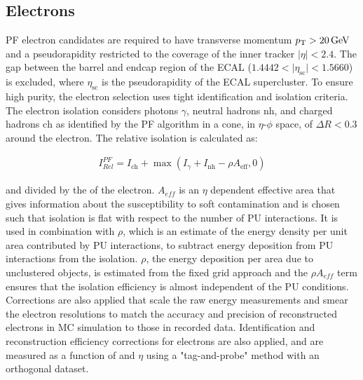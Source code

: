 \subsection{Electrons}
PF electron candidates are required to have transverse momentum $\pT > \SI{20}{\GeV}$ and a pseudorapidity restricted to the coverage of the inner tracker $\vert \eta \vert < 2.4$.
The gap between the barrel and endcap region of the ECAL ($1.4442 < \vert \eta_\mathrm{sc} \vert < 1.5660$) is excluded, where $\eta_\mathrm{sc}$ is the pseudorapidity of the ECAL supercluster.
To ensure high purity, the electron selection uses tight identification and isolation criteria.
The electron isolation considers photons $\gamma$, neutral hadrons $\mathrm{nh}$, and charged hadrons $\mathrm{ch}$ as identified by the PF algorithm in a cone, in $\eta$-$\phi$ space, of $\Delta R < 0.3$ around the electron.
The relative isolation is calculated as: 
\begin{linenomath*}
\begin{align}
I^{PF}_{Rel} = I_{\mathrm{ch}} + \max(I_\gamma + I_{\mathrm{nh}} - \rho A_{\mathrm{eff}}, 0)
\end{align}
\end{linenomath*}
and divided by the \pT of the electron.
$A_{eff}$ is an $\eta$ dependent effective area that gives information about the susceptibility to soft contamination and is chosen such that isolation is flat with respect to the number of PU interactions. 
It is used in combination with $\rho$, which is an estimate of the energy density per unit area contributed by PU interactions, to subtract energy deposition from PU interactions from the isolation.
$\rho$, the energy deposition per area due to unclustered objects, is estimated from the fixed grid approach and the $\rho A_{eff}$ term ensures that the isolation efficiency is almost independent of the PU conditions.
Corrections are also applied that scale the raw energy measurements and smear the electron resolutions to match the accuracy and precision of reconstructed electrons in MC simulation to those in recorded data.
Identification and reconstruction efficiency corrections for electrons are also applied, and are measured as a function of \pT and $\eta$ using a "tag-and-probe" method with an orthogonal dataset.

